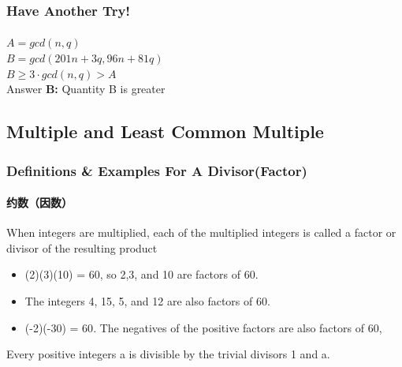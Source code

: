 \documentclass[
	11pt, %
]{beamer}
\begin{document}

\begin{frame}
	\frametitle{Have Another Try!}
	\framesubtitle{}
	$A = gcd(n, q)$ \\
	
	\bigskip
  $B = gcd(201n + 3q, 96n + 81q)$ \\
\bigskip
\pause
$B \geq 3 \cdot gcd(n, q) > A$\\
Answer \textbf{B: } Quantity B is greater
\end{frame}


\subsection{Multiple and Least Common Multiple}


\begin{frame}
	\frametitle{Definitions \& Examples For A Divisor(Factor)}
	\framesubtitle{约数（因数）}
	\begin{definition}
		When integers are multiplied, each of the multiplied integers is called a
\alert{factor or divisor} of the resulting product
	\end{definition}
	
	\smallskip %
	
	\begin{example}
		\begin{itemize}
			\item (2)(3)(10) = 60, so 2,3, and 10 are factors of 60. 
			\item The integers 4, 15, 5, and 12 are also factors of 60. 
			\item \alert{(-2)(-30) = 60}. The negatives of the positive factors are also factors of 60,
		\end{itemize}
	\end{example}
	
	\begin{corollary}
		Every positive integers a is divisible by the trivial divisors 1 and a. 
	\end{corollary}
\end{frame}

\end{document}
